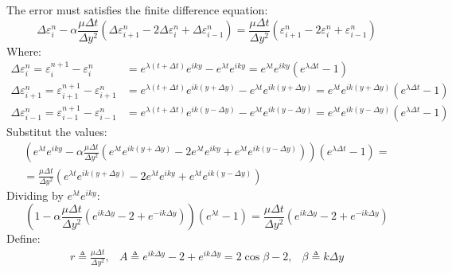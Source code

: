 \documentclass[11pt, a4paper]{article}
\begin{document}
The error must satisfies the finite difference equation:
\begin{equation}
    \Delta \varepsilon^n_i - \alpha\frac{\mu\Delta t}{\Delta y^2}\left(\Delta \varepsilon^n_{i+1}-2\Delta \varepsilon^n_i + \Delta \varepsilon^n_{i-1}\right) = \frac{\mu\Delta t}{\Delta y^2}\left(\varepsilon^n_{i+1} - 2\varepsilon^n_{i} + \varepsilon^n_{i-1}\right)
\end{equation}
Where:
\begin{align}
    \Delta\varepsilon^n_i = \varepsilon^{n+1}_i - \varepsilon^n_i &=e^{\lambda\left(t+\Delta t\right)}e^{iky} - e^{\lambda t}e^{iky} = e^{\lambda t}e^{iky}\left(e^{\lambda\Delta t}-1\right)\\
    \Delta\varepsilon^n_{i+1} = \varepsilon^{n+1}_{i+1} - \varepsilon^n_{i+1} &= e^{\lambda\left(t+\Delta t\right)}e^{ik\left(y+\Delta y\right)} - e^{\lambda t}e^{ik\left(y+\Delta y\right)} = e^{\lambda t}e^{ik\left(y+\Delta y\right)}\left(e^{\lambda\Delta t}-1\right)\\
    \Delta\varepsilon^n_{i-1} = \varepsilon^{n+1}_{i-1} - \varepsilon^n_{i-1} &= e^{\lambda\left(t+\Delta t\right)}e^{ik\left(y-\Delta y\right)} - e^{\lambda t}e^{ik\left(y-\Delta y\right)} = e^{\lambda t}e^{ik\left(y-\Delta y\right)}\left(e^{\lambda\Delta t}-1\right)
\end{align}
Substitut the values:
\begin{equation}
    \begin{matrix}
        \displaystyle\left(e^{\lambda t}e^{iky} - \alpha\frac{\mu\Delta t}{\Delta y^2}\left(e^{\lambda t}e^{ik\left(y+\Delta y\right)} - 2e^{\lambda t}e^{iky} + e^{\lambda t}e^{ik\left(y-\Delta y\right)}\right)\right)\left(e^{\lambda\Delta t}-1\right) =\\
        \displaystyle= \frac{\mu\Delta t}{\Delta y^2}\left(e^{\lambda t}e^{ik\left(y+\Delta y\right)} - 2e^{\lambda t}e^{iky} + e^{\lambda t}e^{ik\left(y-\Delta y\right)}\right)
    \end{matrix}
\end{equation}
Dividing by $e^{\lambda t}e^{iky}$:
\begin{equation}
    \left(1-\alpha\frac{\mu\Delta t}{\Delta y^2}\left(e^{ik\Delta y} -2 + e^{-ik\Delta y}\right)\right)\left(e^{\lambda t}-1\right) = \frac{\mu\Delta t}{\Delta y^2}\left(e^{ik\Delta y} -2 + e^{-ik\Delta y}\right)
\end{equation}
Define:
\begin{equation}
    \begin{matrix}
        \displaystyle r \triangleq \frac{\mu\Delta t}{\Delta y^2}, &\displaystyle A \triangleq e^{ik\Delta y}-2+e^{ik\Delta y}=2\cos\beta-2, & \displaystyle \beta \triangleq k\Delta y
    \end{matrix}
\end{equation}
\end{document}
